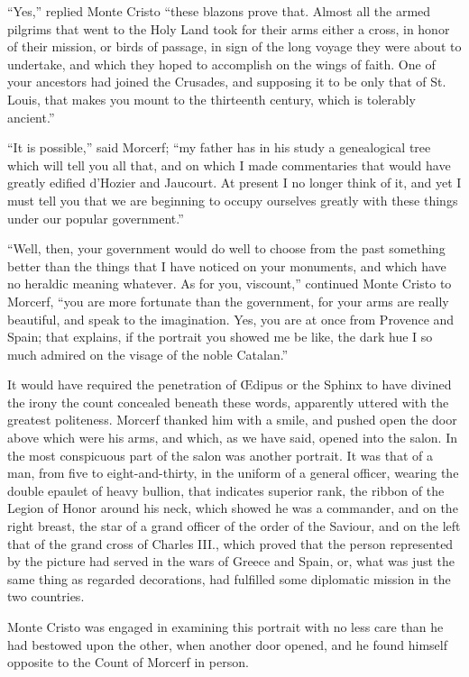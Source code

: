 “Yes,” replied Monte Cristo “these blazons prove that. Almost all the
armed pilgrims that went to the Holy Land took for their arms either a
cross, in honor of their mission, or birds of passage, in sign of the
long voyage they were about to undertake, and which they hoped to
accomplish on the wings of faith. One of your ancestors had joined the
Crusades, and supposing it to be only that of St. Louis, that makes you
mount to the thirteenth century, which is tolerably ancient.”

“It is possible,” said Morcerf; “my father has in his study a
genealogical tree which will tell you all that, and on which I made
commentaries that would have greatly edified d’Hozier and Jaucourt. At
present I no longer think of it, and yet I must tell you that we are
beginning to occupy ourselves greatly with these things under our
popular government.”

“Well, then, your government would do well to choose from the past
something better than the things that I have noticed on your monuments,
and which have no heraldic meaning whatever. As for you, viscount,”
continued Monte Cristo to Morcerf, “you are more fortunate than the
government, for your arms are really beautiful, and speak to the
imagination. Yes, you are at once from Provence and Spain; that
explains, if the portrait you showed me be like, the dark hue I so much
admired on the visage of the noble Catalan.”

It would have required the penetration of Œdipus or the Sphinx to have
divined the irony the count concealed beneath these words, apparently
uttered with the greatest politeness. Morcerf thanked him with a smile,
and pushed open the door above which were his arms, and which, as we
have said, opened into the salon. In the most conspicuous part of the
salon was another portrait. It was that of a man, from five to
eight-and-thirty, in the uniform of a general officer, wearing the
double epaulet of heavy bullion, that indicates superior rank, the
ribbon of the Legion of Honor around his neck, which showed he was a
commander, and on the right breast, the star of a grand officer of the
order of the Saviour, and on the left that of the grand cross of
Charles III., which proved that the person represented by the picture
had served in the wars of Greece and Spain, or, what was just the same
thing as regarded decorations, had fulfilled some diplomatic mission in
the two countries.

Monte Cristo was engaged in examining this portrait with no less care
than he had bestowed upon the other, when another door opened, and he
found himself opposite to the Count of Morcerf in person.

